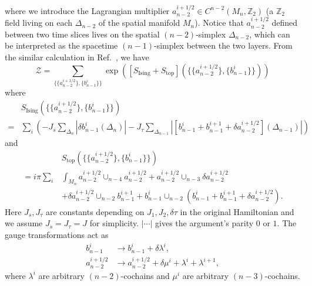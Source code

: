 \documentclass[12pt]{article}
\newcommand{\ZZ}{{\mathbb Z}}
\begin{document}
where we introduce the Lagrangian multiplier $a^{i+1/2}_{n-2} \in C^{n-2}(M_n,\ZZ_2)$ (a $\ZZ_2$ field living on each $\Delta_{n-2}$ of the spatial manifold $M_n$). Notice that $a^{i+1/2}_{n-2}$ defined between two time slices lives on the spatial $(n-2)$-simplex $\Delta_{n-2}$, which can be interpreted as the spacetime $(n-1)$-simplex between the two layers. From the similar calculation in Ref.~\cite{CK18}, we have
\begin{equation}
    \mathcal{Z} = \sum_{ \{ \{ a^{i+1/2}_{n-2}\} , \{ b^i_{n-1}\} \} } \exp ([S_{\text{Ising}} + S_{\text{top}}] (\{ \{ a^{i+1/2}_{n-2}\} , \{ b^i_{n-1}\} \}) )
\end{equation}
where
\begin{equation}
    \begin{split}
        &S_{\text{Ising}}(\{ \{ a^{i+1/2}_{n-2}\} , \{ b^i_{n-1}\} \})  \\
        =& \sum_i \left(-J_s \sum_{\Delta_n} |\delta b^i_{n-1}(\Delta_n)| - J_\tau \sum_{\Delta_{n-1}} | \left[b^i_{n-1} + b^{i+1}_{n-1} + \delta a^{i+1/2}_{n-2}\right] (\Delta_{n-1})| \right)
    \end{split}
\label{eq: S Ising}
\end{equation}
and
\begin{equation}
    \begin{split}
        &S_{\text{top}}(\{ \{ a^{i+1/2}_{n-2}\} , \{ b^i_{n-1}\} \})  \\
        = i \pi \sum_i &\int_{M_n}  a^{i+1/2}_{n-2} \cup_{n-4} a^{i+1/2}_{n-2} + a^{i+1/2}_{n-2} \cup_{n-3} \delta a^{i+1/2}_{n-2} \\
        &+ \delta a^{i+1/2}_{n-2} \cup_{n-2} b^{i+1}_{n-1} + b^{i}_{n-1} \cup_{n-2} ( b^{i}_{n-1} + b^{i+1}_{n-1} + \delta a^{i+1/2}_{n-2}).
    \end{split}
\label{eq: S top}
\end{equation}
Here $J_s, J_\tau$ are constants depending on $J_1,J_2,\delta \tau$ in the original Hamiltonian and we assume $J_s = J_\tau = J$ for simplicity. $|\cdots|$ gives the argument's parity $0$ or $1$. The gauge transformations act as
\begin{equation}
    \begin{split}
        b^i_{n-1} &\rightarrow b^i_{n-1} + \delta \lambda^i,\\
        a^{i+1/2}_{n-2} &\rightarrow a^{i+1/2}_{n-2} + \delta \mu^i + \lambda^i + \lambda^{i+1},
    \end{split}
\label{eq:gauge transformation}
\end{equation}
where $\lambda^i$ are arbitrary $(n-2)$-cochains and $\mu^i$ are arbitrary $(n-3)$-cochains.
\end{document}
